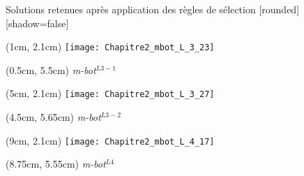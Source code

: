 \documentclass[french]{beamer}
\begin{document}
\begin{frame}{Solutions retenues après application des règles de sélection}
[rounded][shadow=false]

\begin{textblock*}{3cm}(1cm, 2.1cm)
\centering
\texttt{[image: Chapitre2\_mbot\_L\_3\_23]}
\end{textblock*}
\begin{textblock*}{3cm}(0.5cm, 5.5cm)
\small{\textit{m-bot}$^{L3-1}$}
\end{textblock*}

\begin{textblock*}{3cm}(5cm, 2.1cm)
\centering
\texttt{[image: Chapitre2\_mbot\_L\_3\_27]}
\end{textblock*}
\begin{textblock*}{3cm}(4.5cm, 5.65cm)
\small{\textit{m-bot}$^{L3-2}$}
\end{textblock*}

\begin{textblock*}{3cm}(9cm, 2.1cm)
\centering
\texttt{[image: Chapitre2\_mbot\_L\_4\_17]}
\end{textblock*}
\begin{textblock*}{3cm}(8.75cm, 5.55cm)
\small{\textit{m-bot}$^{L4}$}
\end{textblock*}


\end{frame}
\end{document}
